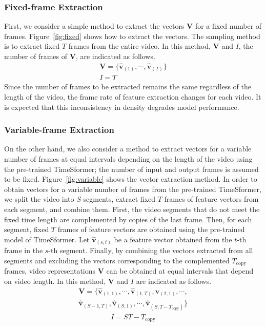 \documentclass[letterpaper]{article} %
\begin{document}
\subsubsection{Fixed-frame Extraction}
%
First, we consider a simple method to extract the vectors $\bm{V}$ for a fixed number of frames.
Figure~\ref{fig:fixed} shows how to extract the vectors.
%
The sampling method is to extract fixed $T$ frames from the entire video.
In this method, $\bm{V}$ and $I$, the number of frames of $\bm{V}$, are indicated as follows.
\begin{gather}
    \bm{V} = \{\bm{\hat{v}}_{(1)}, \cdots , \bm{\hat{v}}_{(T)}\} \\
    I = T
\end{gather}
%
Since the number of frames to be extracted remains the same regardless of the length of the video, the frame rate of feature extraction changes for each video.
%
It is expected that this inconsistency in density degrades model performance.

\subsubsection{Variable-frame Extraction}
%
On the other hand, we also consider a method to extract vectors for a variable number of frames at equal intervals depending on the length of the video using the pre-trained TimeSformer; the number of input and output frames is assumed to be fixed.
Figure~\ref{fig:variable} shows the vector extraction method.
%
In order to obtain vectors for a variable number of frames from the pre-trained TimeSformer, we split the video into $S$ segments, extract fixed $T$ frames of feature vectors from each segment, and combine them.
%
%
First, the video segments that do not meet the fixed time length are complemented by copies of the last frame.
Then, for each segment, fixed $T$ frames of feature vectors are obtained using the pre-trained model of TimeSformer.
Let $\bm{\hat{v}}_{(s,t)}$ be a feature vector obtained from the $t$-th frame in the $s$-th segment.
%
Finally, by combining the vectors extracted from all segments and excluding the vectors corresponding to the complemented $T_{\textrm{copy}}$ frames, video representations $\bm{V}$ can be obtained at equal intervals that depend on video length.
In this method, $\bm{V}$ and $I$ are indicated as follows.
\begin{multline}
    \bm{V} = \{\bm{\hat{v}}_{(1,1)}, \cdots , \bm{\hat{v}}_{(1,T)}, \bm{\hat{v}}_{(2,1)}, \cdots ,\\ \bm{\hat{v}}_{(S-1,T)}, \bm{\hat{v}}_{(S,1)}, \cdots , \bm{\hat{v}}_{(S,T-T_{\textrm{copy}})}\}
\end{multline}
\begin{gather}
    I = ST - T_{\textrm{copy}}
\end{gather}
\end{document}
